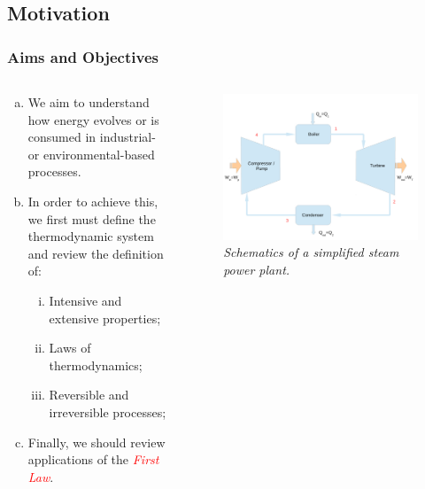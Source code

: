 \documentclass[10pt,compress]{beamer}
\begin{document}
\subsection{Motivation}
\begin{frame}
 \frametitle{Aims and Objectives}
  \begin{columns}
    \begin{column}[l]{0.6\linewidth}
     \begin{enumerate}[(a)]
      \item <2-> We aim to understand how energy evolves or is consumed in industrial- or environmental-based processes.
      \item <3-> In order to achieve this, we first must define the thermodynamic system and review the definition of:
       \begin{enumerate}[(i)]
        \item  Intensive and extensive properties;
        \item  Laws of thermodynamics;
        \item  Reversible and irreversible processes;
       \end{enumerate}
      \item <4->Finally, we should review applications of the \textcolor{red}{{\it First Law}}. 
     \end{enumerate}
    \end{column}
     \begin{column}[l]{0.4\linewidth}
      \begin{figure}%
        \begin{center}
          \includegraphics[width=\columnwidth,clip]{./Pics/Fig_SteamPowerPlant2}
           \caption{{\it Schematics of a simplified steam power plant.}} 
        \end{center}
      \end{figure}
    \end{column}
  \end{columns}
\end{frame}
\end{document}
